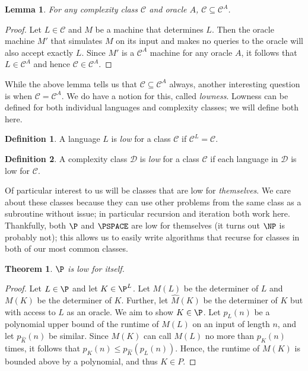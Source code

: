 \documentclass[english]{reedthesis}
\theoremstyle{plain}
\newtheorem{thm}{Theorem}[section]
\newtheorem{lemma}[lemma]{Lemma}
\theoremstyle{definition}
\newtheorem{defn}[defn]{Definition}
\theoremstyle{remark}
\begin{document}
\begin{lemma}\label{thm:relativizing-increases}
  For any complexity class $\mathcal{C}$ and oracle $A$, $\mathcal{C} \subseteq \mathcal{C}^{A}$.
\end{lemma}

\begin{proof}
  Let $L \in \mathcal{C}$ and $M$ be a machine that determines $L$. Then the oracle machine
  $M'$ that simulates $M$ on its input and makes no queries to the oracle will
  also accept exactly $L$. Since $M'$ is a $\mathcal{C}^{A}$ machine for any oracle $A$,
  it follows that $L \in \mathcal{C}^{A}$ and hence $\mathcal{C} \in \mathcal{C}^{A}$.
\end{proof}

While the above lemma tells us that $\mathcal{C} \subseteq \mathcal{C}^{A}$ always, another interesting
question is when $\mathcal{C} = \mathcal{C}^{A}$. We do have a notion for this, called
\emph{lowness}. Lowness can be defined for both individual languages and
complexity classes; we will define both here.

\begin{defn}\label{def:low-class}
  A language $L$ is \emph{low} for a class $\mathcal{C}$ if $\mathcal{C}^{L} = \mathcal{C}$.
\end{defn}

\begin{defn}\label{def:low-lang}
  A complexity class $\mathcal{D}$ is \emph{low} for a class $\mathcal{C}$ if each language in $\mathcal{D}$
  is low for $\mathcal{C}$.
\end{defn}

Of particular interest to us will be classes that are low for \emph{themselves}.
We care about these classes because they can use other problems from the same
class as a subroutine without issue; in particular recursion and iteration both
work here. Thankfully, both $\P$ and $\PSPACE$ are low for themselves (it turns
out $\NP$ is probably not); this allows us to easily write algorithms that
recurse for classes in both of our most common classes.

\begin{thm}\label{thm:p-low}
  $\P$ is low for itself.
\end{thm}

\begin{proof}
  Let $L \in \P$ and let $K \in \P^{L}$. Let $M(L)$ be the determiner of $L$ and
  $M(K)$ be the determiner of $K$. Further, let $\hat{M}(K)$ be the determiner
  of $K$ but with access to $L$ as an oracle. We aim to show $K \in \P$. Let
  $p_{L}(n)$ be a polynomial upper bound of the runtime of $M(L)$ on an input of
  length $n$, and let $p_{\hat{K}}(n)$ be similar. Since $M(K)$ can call $M(L)$ no
  more than $p_{\hat{K}}(n)$ times, it follows that
  $p_{K}(n) \le p_{\hat{K}}(p_{L}(n))$. Hence, the runtime of $M(K)$ is bounded
  above by a polynomial, and thus $K \in P$.
\end{proof}
\end{document}
